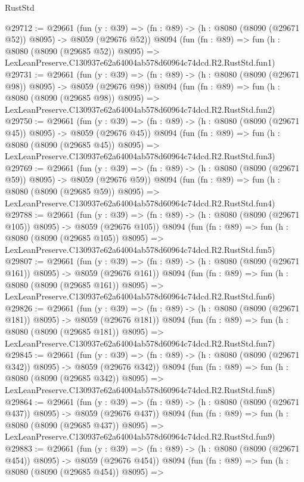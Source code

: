 \begin{lexlean}{RustStd}
\begin{coremodule}
@29712 := @29661
    (fun (y : @39) => (fn : @89) -> (h : @8080 (@8090 (@29671 @52)) @8095) -> @8059 (@29676 @52))
    @8094
    (fun (fn : @89) =>
    fun (h : @8080 (@8090 (@29685 @52)) @8095) =>
    LexLeanPreserve.C130937e62a64004ab578d60964c74dcd.R2.RustStd.fun1)
@29731 := @29661
    (fun (y : @39) => (fn : @89) -> (h : @8080 (@8090 (@29671 @98)) @8095) -> @8059 (@29676 @98))
    @8094
    (fun (fn : @89) =>
    fun (h : @8080 (@8090 (@29685 @98)) @8095) =>
    LexLeanPreserve.C130937e62a64004ab578d60964c74dcd.R2.RustStd.fun2)
@29750 := @29661
    (fun (y : @39) => (fn : @89) -> (h : @8080 (@8090 (@29671 @45)) @8095) -> @8059 (@29676 @45))
    @8094
    (fun (fn : @89) =>
    fun (h : @8080 (@8090 (@29685 @45)) @8095) =>
    LexLeanPreserve.C130937e62a64004ab578d60964c74dcd.R2.RustStd.fun3)
@29769 := @29661
    (fun (y : @39) => (fn : @89) -> (h : @8080 (@8090 (@29671 @59)) @8095) -> @8059 (@29676 @59))
    @8094
    (fun (fn : @89) =>
    fun (h : @8080 (@8090 (@29685 @59)) @8095) =>
    LexLeanPreserve.C130937e62a64004ab578d60964c74dcd.R2.RustStd.fun4)
@29788 := @29661
    (fun (y : @39) => (fn : @89) -> (h : @8080 (@8090 (@29671 @105)) @8095) -> @8059 (@29676 @105))
    @8094
    (fun (fn : @89) =>
    fun (h : @8080 (@8090 (@29685 @105)) @8095) =>
    LexLeanPreserve.C130937e62a64004ab578d60964c74dcd.R2.RustStd.fun5)
@29807 := @29661
    (fun (y : @39) => (fn : @89) -> (h : @8080 (@8090 (@29671 @161)) @8095) -> @8059 (@29676 @161))
    @8094
    (fun (fn : @89) =>
    fun (h : @8080 (@8090 (@29685 @161)) @8095) =>
    LexLeanPreserve.C130937e62a64004ab578d60964c74dcd.R2.RustStd.fun6)
@29826 := @29661
    (fun (y : @39) => (fn : @89) -> (h : @8080 (@8090 (@29671 @181)) @8095) -> @8059 (@29676 @181))
    @8094
    (fun (fn : @89) =>
    fun (h : @8080 (@8090 (@29685 @181)) @8095) =>
    LexLeanPreserve.C130937e62a64004ab578d60964c74dcd.R2.RustStd.fun7)
@29845 := @29661
    (fun (y : @39) => (fn : @89) -> (h : @8080 (@8090 (@29671 @342)) @8095) -> @8059 (@29676 @342))
    @8094
    (fun (fn : @89) =>
    fun (h : @8080 (@8090 (@29685 @342)) @8095) =>
    LexLeanPreserve.C130937e62a64004ab578d60964c74dcd.R2.RustStd.fun8)
@29864 := @29661
    (fun (y : @39) => (fn : @89) -> (h : @8080 (@8090 (@29671 @437)) @8095) -> @8059 (@29676 @437))
    @8094
    (fun (fn : @89) =>
    fun (h : @8080 (@8090 (@29685 @437)) @8095) =>
    LexLeanPreserve.C130937e62a64004ab578d60964c74dcd.R2.RustStd.fun9)
@29883 := @29661
    (fun (y : @39) => (fn : @89) -> (h : @8080 (@8090 (@29671 @454)) @8095) -> @8059 (@29676 @454))
    @8094
    (fun (fn : @89) =>
    fun (h : @8080 (@8090 (@29685 @454)) @8095) =>

\end{coremodule}
\end{lexlean}
